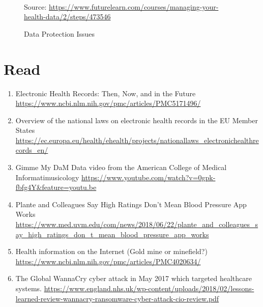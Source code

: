 \documentclass[10pt, twoside]{article}   	%
\begin{document}
\begin{figure}
\begin{subfigure}[b]{0.3\textwidth}
\end{subfigure}
\hfill
\hfill
\\
{\scriptsize%
Source: \url{https://www.futurelearn.com/courses/managing-your-health-data/2/steps/473546}}
\caption{Data Protection Issues}
\label{fig:DataProtection_Issues}
\end{figure}











\section{Read}
\renewcommand{\labelenumii}{\alph{enumii}}
      \begin{enumerate}
       \item  Electronic Health Records: Then, Now, and in the Future \url{https://www.ncbi.nlm.nih.gov/pmc/articles/PMC5171496/}
        \item   Overview of the national laws on electronic health records in the EU Member States \url{https://ec.europa.eu/health/ehealth/projects/nationallaws_electronichealthrecords_en/}
        \item  Gimme My DaM Data video from the American College of Medical Informatimusicology  \url{https://www.youtube.com/watch?v=0gpk-fbfg4Y&feature=youtu.be}   
        \item Plante and Colleagues Say High Ratings Don’t Mean Blood Pressure App Works \url{https://www.med.uvm.edu/com/news/2018/06/22/plante_and_colleagues_say_high_ratings_don_t_mean_blood_pressure_app_works}
        \item Health information on the Internet (Gold mine or minefield?) \url{https://www.ncbi.nlm.nih.gov/pmc/articles/PMC4020634/}
        \item The Global WannaCry cyber attack in May 2017 which targeted healthcare systems. \url{https://www.england.nhs.uk/wp-content/uploads/2018/02/lessons-learned-review-wannacry-ransomware-cyber-attack-cio-review.pdf}

       \end {enumerate}   
\end{document}
